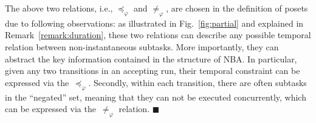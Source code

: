 \begin{remark}\label{remark:partial-order-motivation}
The above two relations, i.e., $\preceq_\varphi$ and $\neq_\varphi$,
are chosen in the definition of posets due to following observations:
as illustrated in Fig.~\ref{fig:partial} and explained in Remark~\ref{remark:duration},
these two relations can describe any possible temporal relation
between non-instantaneous subtasks.
More importantly,
they can abstract the key information contained in the structure of NBA.
In particular, given any two transitions in an accepting run,
their temporal constraint can be expressed via the~$\preceq_\varphi$.
Secondly, within each transition, there are often subtasks in the ``negated'' set,
meaning that they can not be executed concurrently,
which can be expressed via the~$\neq_\varphi$ relation.
\hfill $\blacksquare$
\end{remark}

